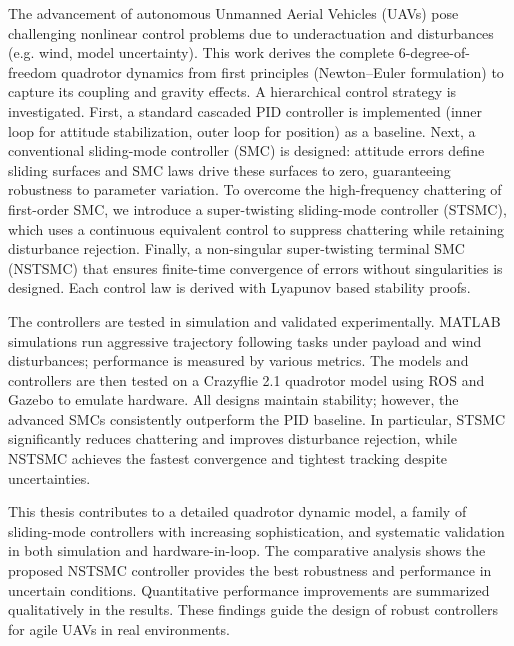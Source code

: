 The advancement of autonomous Unmanned Aerial Vehicles (UAVs) pose challenging nonlinear control problems due to underactuation and disturbances (e.g. wind, model uncertainty). This work derives the complete 6-degree-of-freedom quadrotor dynamics from first principles (Newton–Euler formulation) to capture its coupling and gravity effects. A hierarchical control strategy is investigated. First, a standard cascaded PID controller is implemented (inner loop for attitude stabilization, outer loop for position) as a baseline. Next, a conventional sliding-mode controller (SMC) is designed: attitude errors define sliding surfaces and SMC laws drive these surfaces to zero, guaranteeing robustness to parameter variation. To overcome the high-frequency chattering of first-order SMC, we introduce a super-twisting sliding-mode controller (STSMC), which uses a continuous equivalent control to suppress chattering while retaining disturbance rejection. Finally, a non-singular super-twisting terminal SMC (NSTSMC) that ensures finite-time convergence of errors without singularities is designed. Each control law is derived with Lyapunov based stability proofs.

The controllers are tested in simulation and validated experimentally. MATLAB simulations run aggressive trajectory following tasks under payload and wind disturbances; performance is measured by various metrics. The models and controllers are then tested on a Crazyflie 2.1 quadrotor model using ROS and Gazebo to emulate hardware. All designs maintain stability; however, the advanced SMCs consistently outperform the PID baseline. In particular, STSMC significantly reduces chattering and improves disturbance rejection, while NSTSMC achieves the fastest convergence and tightest tracking despite uncertainties.

This thesis contributes to a detailed quadrotor dynamic model, a family of sliding-mode controllers with increasing sophistication, and  systematic validation in both simulation and hardware-in-loop. The comparative analysis shows the proposed NSTSMC controller provides the best robustness and performance in uncertain conditions. Quantitative performance improvements are summarized qualitatively in the results. These findings guide the design of robust controllers for agile UAVs in real environments. 